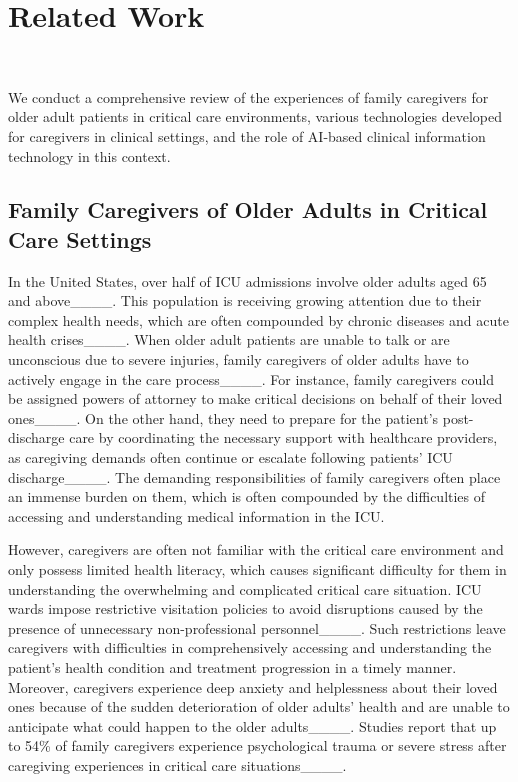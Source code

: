 \section{Related Work}
~\label{relatedwork}

We conduct a comprehensive review of the experiences of family caregivers for older adult patients in critical care environments, various technologies developed for caregivers in clinical settings, and the role of AI-based clinical information technology in this context.
\subsection{Family Caregivers of Older Adults in Critical Care Settings}

In the United States, over half of ICU admissions involve older adults aged 65 and above____. 
This population is receiving growing attention due to their complex health needs, which are often compounded by chronic diseases and acute health crises____. 
When older adult patients are unable to talk or are unconscious due to severe injuries, family caregivers of older adults have to actively engage in the care process____.
For instance, family caregivers could be assigned powers of attorney to make critical decisions on behalf of their loved ones____.
On the other hand, they need to prepare for the patient’s post-discharge care by coordinating the necessary support with healthcare providers, as caregiving demands often continue or escalate following patients' ICU discharge____. 
The demanding responsibilities of family caregivers often place an immense burden on them, which is often compounded by the difficulties of accessing and understanding medical information in the ICU.


However, caregivers are often not familiar with the critical care environment and only possess limited health literacy, which causes significant difficulty for them in understanding the overwhelming and complicated critical care situation.
ICU wards impose restrictive visitation policies to avoid disruptions caused by the presence of unnecessary non-professional personnel____. 
Such restrictions leave caregivers with difficulties in comprehensively accessing and understanding the patient's health condition and treatment progression in a timely manner.
Moreover, caregivers experience deep anxiety and helplessness about their loved ones because of the sudden deterioration of older adults' health and are unable to anticipate what could happen to the older adults____.
Studies report that up to 54\% of family caregivers experience psychological trauma or severe stress after caregiving experiences in critical care situations____.

